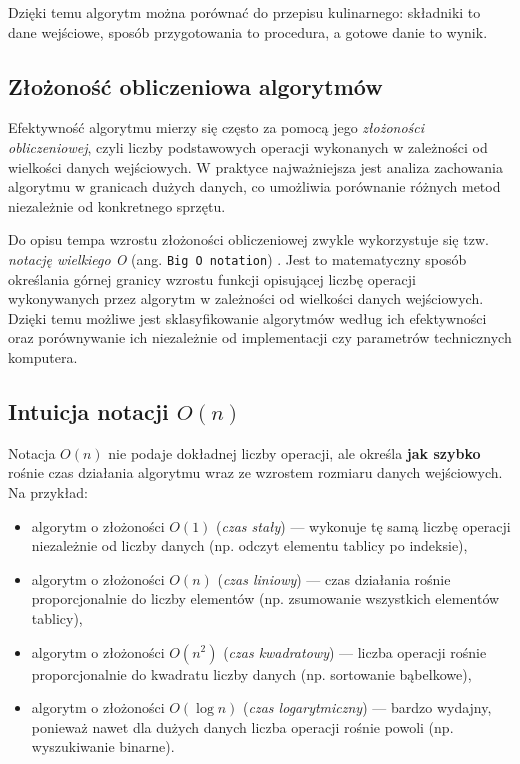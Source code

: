 \documentclass[a4paper,12pt]{book} %
\begin{document}
Dzięki temu algorytm można porównać do przepisu kulinarnego: składniki to dane wejściowe, sposób przygotowania to procedura, a gotowe danie to wynik.

\subsection{Złożoność obliczeniowa algorytmów}

Efektywność algorytmu mierzy się często za pomocą jego \emph{złożoności obliczeniowej}, czyli liczby podstawowych operacji wykonanych w zależności od wielkości danych wejściowych. W praktyce najważniejsza jest analiza zachowania algorytmu w granicach dużych danych, co umożliwia porównanie różnych metod niezależnie od konkretnego sprzętu.

Do opisu tempa wzrostu złożoności obliczeniowej zwykle wykorzystuje się tzw. \emph{notację wielkiego O} (ang. \texttt{Big O notation}) \cite{Algorithms_introduction}. Jest to matematyczny sposób określania górnej granicy wzrostu funkcji opisującej liczbę operacji wykonywanych przez algorytm w zależności od wielkości danych wejściowych. Dzięki temu możliwe jest sklasyfikowanie algorytmów według ich efektywności oraz porównywanie ich niezależnie od implementacji czy parametrów technicznych komputera.

\subsection*{Intuicja notacji \(O(n)\)}

Notacja \(O(n)\) nie podaje dokładnej liczby operacji, ale określa \textbf{jak szybko} rośnie czas działania algorytmu wraz ze wzrostem rozmiaru danych wejściowych. Na przykład:
\begin{itemize}
    \item algorytm o złożoności \(O(1)\) (\textit{czas stały}) — wykonuje tę samą liczbę operacji niezależnie od liczby danych (np. odczyt elementu tablicy po indeksie),
    \item algorytm o złożoności \(O(n)\) (\textit{czas liniowy}) — czas działania rośnie proporcjonalnie do liczby elementów (np. zsumowanie wszystkich elementów tablicy),
    \item algorytm o złożoności \(O(n^2)\) (\textit{czas kwadratowy}) — liczba operacji rośnie proporcjonalnie do kwadratu liczby danych (np. sortowanie bąbelkowe),
    \item algorytm o złożoności \(O(\log n)\) (\textit{czas logarytmiczny}) — bardzo wydajny, ponieważ nawet dla dużych danych liczba operacji rośnie powoli (np. wyszukiwanie binarne).
\end{itemize}
\end{document}
